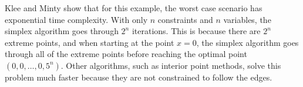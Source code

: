 %
%
%
%

Klee and Minty show that for this example, the worst case scenario has exponential time complexity.
With only $n$ constraints and $n$ variables, the simplex algorithm goes through $2^n$ iterations.
This is because there are $2^n$ extreme points, and when starting at the point $x=0$, the simplex algorithm goes through all of the extreme points before reaching the optimal point $(0,0,\dots, 0, 5^n)$.
Other algorithms, such as interior point methods, solve this problem much faster because they are not constrained to follow the edges.

